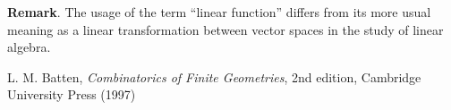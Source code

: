 \documentclass[12pt]{article}
\begin{document}
\textbf{Remark}.  The usage of the term ``linear function'' differs from its more usual meaning as a linear transformation between vector spaces in the study of linear algebra.

\begin{thebibliography}{7}
 L. M. Batten, {\it Combinatorics of Finite Geometries}, 2nd edition, Cambridge University Press (1997)
\end{thebibliography}
\end{document}
